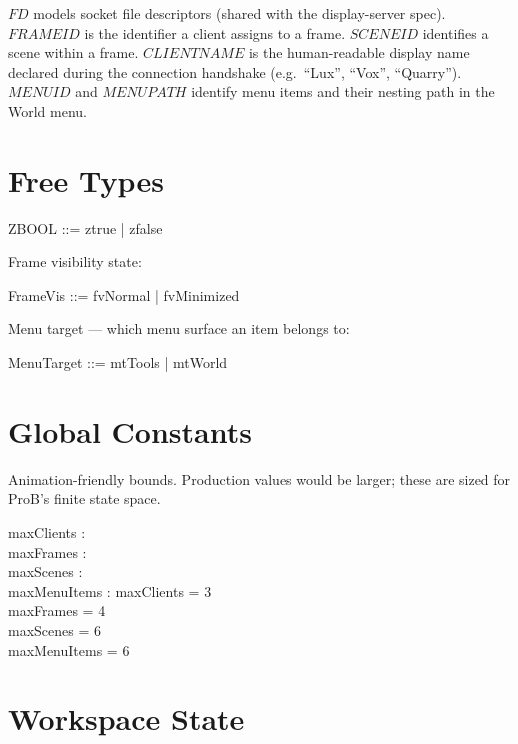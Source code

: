 \documentclass[a4paper,10pt,fleqn]{article}
\begin{document}
$FD$ models socket file descriptors (shared with the display-server
spec).  $FRAMEID$ is the identifier a client assigns to a frame.
$SCENEID$ identifies a scene within a frame.  $CLIENTNAME$ is the
human-readable display name declared during the connection handshake
(e.g.\ ``Lux'', ``Vox'', ``Quarry'').  $MENUID$ and $MENUPATH$
identify menu items and their nesting path in the World menu.

\section{Free Types}

\begin{zed}
  ZBOOL ::= ztrue | zfalse
\end{zed}

Frame visibility state:
\begin{zed}
  FrameVis ::= fvNormal | fvMinimized
\end{zed}

Menu target --- which menu surface an item belongs to:
\begin{zed}
  MenuTarget ::= mtTools | mtWorld
\end{zed}

\section{Global Constants}

Animation-friendly bounds.  Production values would be larger;
these are sized for ProB's finite state space.

\begin{axdef}
  maxClients : \nat \\
  maxFrames : \nat \\
  maxScenes : \nat \\
  maxMenuItems : \nat
  \where
  maxClients = 3 \\
  maxFrames = 4 \\
  maxScenes = 6 \\
  maxMenuItems = 6
\end{axdef}

\section{Workspace State}
\end{document}
